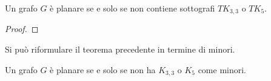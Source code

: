 \begin{teorema}
    Un grafo \(G\) è planare se e solo se non contiene sottografi \(TK_{3,3}\) o \(TK_5\).
    \begin{proof}
        
    \end{proof}
\end{teorema}
\noindent Si può riformulare il teorema precedente in termine di minori.
\begin{teorema}
    Un grafo \(G\) è planare se e solo se non ha \(K_{3,3}\) o \(K_5\) come minori.
\end{teorema}


